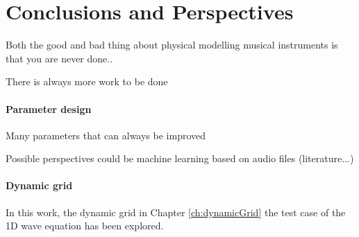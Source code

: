 \chapter{Conclusions and Perspectives}\label{ch:conclusion}

Both the good and bad thing about physical modelling musical instruments is that you are never done..

There is always more work to be done


\subsubsection{Parameter design}
Many parameters that can always be improved

Possible perspectives could be machine learning based on audio files (literature...)

\subsubsection{Dynamic grid}
In this work, the dynamic grid in Chapter \ref{ch:dynamicGrid} the test case of the 1D wave equation has been explored. 